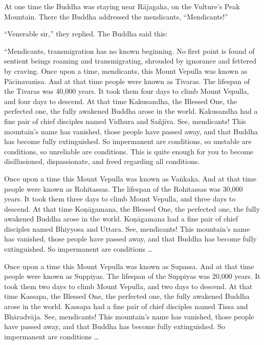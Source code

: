 \documentclass[12pt,openany]{book}%
\begin{document}
At one time the Buddha was staying near \textsanskrit{Rājagaha}, on the Vulture’s Peak Mountain. There the Buddha addressed the mendicants, “Mendicants!” 

“Venerable sir,” they replied. The Buddha said this: 

“Mendicants, transmigration has no known beginning. No first point is found of sentient beings roaming and transmigrating, shrouded by ignorance and fettered by craving. Once upon a time, mendicants, this Mount Vepulla was known as \textsanskrit{Pācīnavaṁsa}. And at that time people were known as Tivaras. The lifespan of the Tivaras was 40,000 years. It took them four days to climb Mount Vepulla, and four days to descend. At that time Kakusandha, the Blessed One, the perfected one, the fully awakened Buddha arose in the world. Kakusandha had a fine pair of chief disciples named Vidhura and \textsanskrit{Sañjīva}. See, mendicants! This mountain’s name has vanished, those people have passed away, and that Buddha has become fully extinguished. So impermanent are conditions, so unstable are conditions, so unreliable are conditions. This is quite enough for you to become disillusioned, dispassionate, and freed regarding all conditions. 

Once upon a time this Mount Vepulla was known as \textsanskrit{Vaṅkaka}. And at that time people were known as Rohitassas. The lifespan of the Rohitassas was 30,000 years. It took them three days to climb Mount Vepulla, and three days to descend. At that time \textsanskrit{Koṇāgamana}, the Blessed One, the perfected one, the fully awakened Buddha arose in the world. \textsanskrit{Koṇāgamana} had a fine pair of chief disciples named Bhiyyosa and Uttara. See, mendicants! This mountain’s name has vanished, those people have passed away, and that Buddha has become fully extinguished. So impermanent are conditions … 

Once upon a time this Mount Vepulla was known as Supassa. And at that time people were known as Suppiyas. The lifespan of the Suppiyas was 20,000 years. It took them two days to climb Mount Vepulla, and two days to descend. At that time Kassapa, the Blessed One, the perfected one, the fully awakened Buddha arose in the world. Kassapa had a fine pair of chief disciples named Tissa and \textsanskrit{Bhāradvāja}. See, mendicants! This mountain’s name has vanished, those people have passed away, and that Buddha has become fully extinguished. So impermanent are conditions … 
\end{document}
